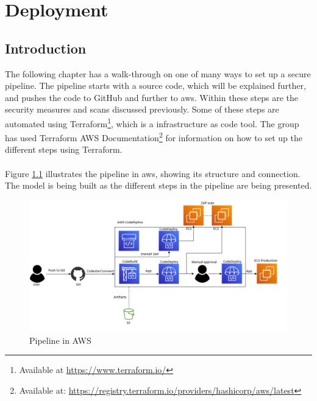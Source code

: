 \newpage
\thispagestyle{empty}
\mbox{}

\chapter{Deployment}
\label{Deployment}
\section{Introduction}
The following chapter has a walk-through on one of many ways to set up a secure pipeline. The pipeline starts with a source code, which will be explained further, and pushes the code to GitHub and further to \acrshort{aws}. Within these steps are the security measures and scans discussed previously. Some of these steps are automated using Terraform\footnote{Available at \url{https://www.terraform.io/}}, which is a \gls{infrastructure as code} tool. The group has used Terraform AWS Documentation\footnote{Available at: \url{https://registry.terraform.io/providers/hashicorp/aws/latest}} for information on how to set up the different steps using Terraform. 
\\~\\
Figure \ref{fig: Pipeline in AWS} illustrates the pipeline in \acrshort{aws}, showing its structure and connection. The model is being built as the different steps in the pipeline are being presented.

\vspace{2mm}
\begin{figure}[H]
    \centering
    \includegraphics[width=1\columnwidth]{Images/aws-piplin-7.png}
    \caption{Pipeline in AWS}
    \label{fig: Pipeline in AWS}
\end{figure}

